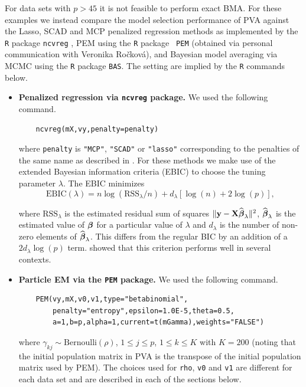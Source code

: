 For data sets with $p>45$ it is not feasible to perform exact BMA.  For these
examples we instead compare the model selection performance of PVA against the
Lasso, SCAD and MCP penalized regression methods as implemented by the {\tt R}
package {\tt ncvreg} \citep{Breheny2011}, PEM using the {\tt R} package {\tt
PEM} (obtained via personal communication with Veronika Ro\v{c}kov\'a), and
Bayesian model averaging via MCMC using the {\tt R} package {\tt BAS}.  The
setting are implied by the {\tt R} commands below.
\begin{itemize}

    \item {\bf Penalized regression via {\tt ncvreg} package.} We used the
        following command.
\begin{verbatim}
    ncvreg(mX,vy,penalty=penalty)
\end{verbatim}

    \noindent where {\tt penalty} is {\tt "MCP"}, {\tt "SCAD"} or {\tt "lasso"}
    corresponding to the penalties of the same name as described in
    \cite{Breheny2011}.  For these methods we make use of the extended Bayesian
    information criteria (EBIC) \citep{Chen2008} to choose the tuning parameter
    $\lambda$. The EBIC minimizes
    $$
    \mbox{EBIC}(\lambda) = n\log(\mbox{RSS}_\lambda/n) + d_\lambda
    \left[ \log(n) + 2\log(p) \right],
    $$
    
    \noindent where $\mbox{RSS}_\lambda$ is the estimated residual sum of
    squares $\|{\bf y} - {\bf X}\widehat{{\boldsymbol \beta}}_\lambda\|^2$,
    $\widehat{{\boldsymbol \beta}}_\lambda$ is the estimated value of ${\boldsymbol \beta}$ for a
    particular value of $\lambda$ and $d_\lambda$ is the number of non-zero
    elements of $\widehat{{\boldsymbol \beta}}_\lambda$.  This differs from the regular BIC
    by an addition of a $2 d_\lambda \log(p)$ term.  \cite{Wang2007} showed
    that this criterion performs well in several contexts.
	
    \item {\bf Particle EM via the {\tt PEM} package.} We used the following
        command.
	\begin{verbatim}
	PEM(vy,mX,v0,v1,type="betabinomial", 
		penalty="entropy",epsilon=1.0E-5,theta=0.5, 
		a=1,b=p,alpha=1,current=t(mGamma),weights="FALSE")
	\end{verbatim}
	
    \noindent where $\gamma_{kj} \sim \mbox{Bernoulli}(\rho)$, $1\le j\le p$,
    $1\le k\le K$ with $K=200$ (noting that the initial population matrix in
    PVA is the transpose of the initial population matrix used by PEM). The
    choices used for {\tt rho}, {\tt v0} and {\tt v1} are different for each
    data set and are described in each of the sections below.
	

\end{itemize}
